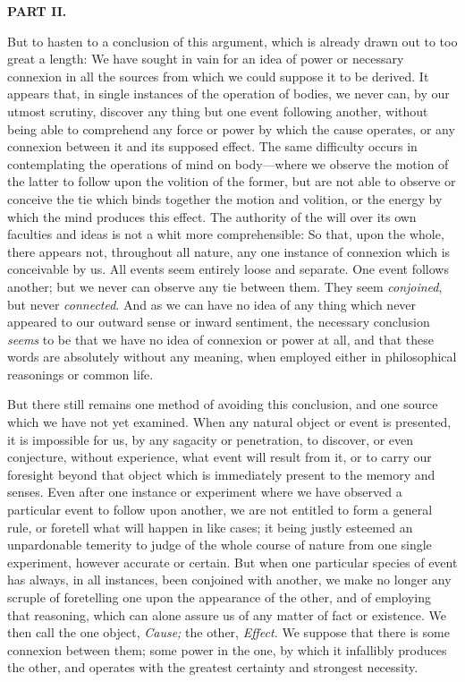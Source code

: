 \documentclass[]{article}
\newcommand*{\itemsubsection}[1]{\begin{center}\addcontentsline{toc}{subsection}{#1}\textbf{#1}\end{center}}
\begin{document}
\itemsubsection{PART II.}

\begin{sectionbody}

\humeparagraph  But to hasten to a conclusion of this argument, which is already drawn out to too great a length: We have sought in vain for an idea of power or necessary connexion in all the sources from which we could suppose it to be derived. It appears that, in single instances of the operation of bodies, we never can, by our utmost scrutiny, discover any thing but one event following another, without being able to comprehend any force or power by which the cause operates, or any connexion between it and its supposed effect. The same difficulty occurs in contemplating the operations of mind on body---where we observe the motion of the latter to follow upon the volition of the former, but are not able to observe or conceive the tie which binds together the motion and volition, or the energy by which the mind produces this effect. The authority of the will over its own faculties and ideas is not a whit more comprehensible: So that, upon the whole, there appears not, throughout all nature, any one instance of connexion which is conceivable by us. All events seem entirely loose and separate. One event follows another; but we never can observe any tie between them. They seem \emph{conjoined}, but never \emph{connected}. And as we can have no idea of any thing which never appeared to our outward sense or inward sentiment, the necessary conclusion \emph{seems} to be that we have no idea of connexion or power at all, and that these words are absolutely without any meaning, when employed either in philosophical reasonings or common life.

\humeparagraph  But there still remains one method of avoiding this conclusion, and one source which we have not yet examined. When any natural object or event is presented, it is impossible for us, by any sagacity or penetration, to discover, or even conjecture, without experience, what event will result from it, or to carry our foresight beyond that object which is immediately present to the memory and senses. Even after one instance or experiment where we have observed a particular event to follow upon another, we are not entitled to form a general rule, or foretell what will happen in like cases; it being justly esteemed an unpardonable temerity to judge of the whole course of nature from one single experiment, however accurate or certain. But when one particular species of event has always, in all instances, been conjoined with another, we make no longer any scruple of foretelling one upon the appearance of the other, and of employing that reasoning, which can alone assure us of any matter of fact or existence. We then call the one object, \emph{Cause;} the other, \emph{Effect.} We suppose that there is some connexion between them; some power in the one, by which it infallibly produces the other, and operates with the greatest certainty and strongest necessity.


\end{sectionbody}
\end{document}
